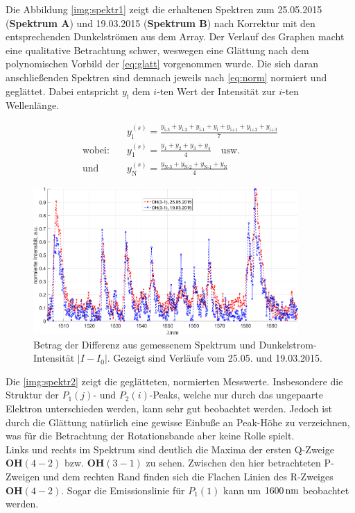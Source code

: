 \documentclass[numbers=noenddot,a4paper,notitlepage,twoside,BCOR15mm]{scrartcl}
\newcommand{\ix}[1]{_\text{#1}}
\newcommand{\fett}[1]{\textbf{#1}}
\begin{document}
			Die Abbildung \autoref{img:spektr1} zeigt die erhaltenen Spektren zum  25.05.2015 (\fett{Spektrum A}) und 19.03.2015 (\fett{Spektrum B}) nach Korrektur mit den entsprechenden Dunkelströmen aus dem Array. Der Verlauf des Graphen macht eine qualitative Betrachtung schwer, weswegen eine Glättung nach dem polynomischen Vorbild der \autoref{eq:glatt} vorgenommen wurde. Die sich daran anschließenden Spektren sind demnach jeweils nach \autoref{eq:norm} normiert und geglättet. Dabei entspricht $y\ix{i}$ dem $i$-ten Wert der Intensität zur $i$-ten Wellenlänge.

				\begin{align}
					&y^{(s)}\ix{i}=\frac{y\ix{i-3}+y\ix{i-2}+y\ix{i-1}+y\ix{i}+y\ix{i+1}+y\ix{i+2}+y\ix{i+3}}{7} \label{eq:glatt} \\
					\text{wobei:} \quad &y^{(s)}\ix{1}=\frac{y\ix{1}+y\ix{2}+y\ix{3}+y\ix{4}}{4} \quad \text{usw.} \nonumber\\
					\text{und} \quad &y^{(s)}\ix{N}=\frac{y\ix{N-3}+y\ix{N-2}+y\ix{N-1}+y\ix{N}}{4} \nonumber
				\end{align}

				\begin{figure}
					\centering
					\includegraphics[width=0.9\textwidth]{spektr_unsmooth.png}
					\caption{Betrag der Differenz aus gemessenem Spektrum und Dunkelstrom-Intensität $|I-I\ix{0}|$. Gezeigt sind Verläufe vom 25.05. und 19.03.2015.}
					\label{img:spektr1}
				\end{figure}

			Die \autoref{img:spektr2} zeigt die geglätteten, normierten Messwerte. Insbesondere die Struktur der $P\ix{1}(j)$- und $P\ix{2}(i)$-Peaks, welche nur durch das ungepaarte Elektron unterschieden werden, kann sehr gut beobachtet werden. Jedoch ist durch die Glättung natürlich eine gewisse Einbuße an Peak-Höhe zu verzeichnen, was für die Betrachtung der Rotationsbande aber keine Rolle spielt.\\
			Links und rechts im Spektrum sind deutlich die Maxima der ersten Q-Zweige $\fett{OH}(4-2)$ bzw. $\fett{OH}(3-1)$ zu sehen. Zwischen den hier betrachteten P-Zweigen und dem rechten Rand finden sich die Flachen Linien des R-Zweiges $\fett{OH}(4-2)$. Sogar die Emissionslinie für $P\ix{1}(1)$ kann um $\unit[1600]{nm}$ beobachtet werden.
\end{document}
